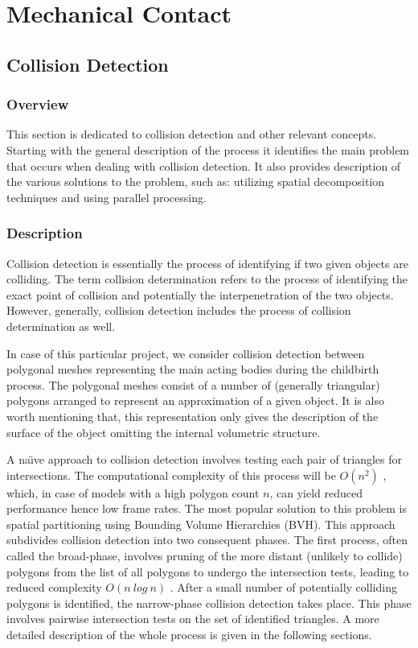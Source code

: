 \chapter{Mechanical Contact}\label{methodology-contact}

\section{Collision Detection}
  \subsection{Overview}
  This section is dedicated to collision detection and other relevant concepts. Starting with the general description of the process it identifies the main problem that occurs when dealing with collision detection. It also provides description of the various solutions to the problem, such as: utilizing spatial decomposition techniques and using parallel processing.
  \subsection{Description}
    Collision detection is essentially the process of identifying if two given objects are colliding. The term collision determination refers to the process of identifying the exact point of collision and potentially the interpenetration of the two objects. However, generally, collision detection includes the process of collision determination as well.

    In case of this particular project, we consider collision detection between polygonal meshes representing the main acting bodies during the childbirth process. The polygonal meshes consist of a number of (generally triangular) polygons arranged to represent an approximation of a given object. It is also worth mentioning that, this representation only gives the description of the surface of the object omitting the internal volumetric structure.


A na\"{\i}ve approach to collision detection involves testing each pair of triangles for intersections. The computational complexity of this process will be $O(n^2)$ \citep{gpuGems32}, which, in case of models with a high polygon count $n$, can yield reduced performance hence low frame rates. The most popular solution to this problem is spatial partitioning using Bounding Volume Hierarchies (BVH). This approach subdivides collision detection into two consequent phases. The first process, often called the broad-phase, involves pruning of the more distant (unlikely to collide) polygons from the list of all polygons to undergo the intersection tests, leading to reduced complexity $O(n~log~n)$ \citep{MPI}. After a small number of potentially colliding polygons is identified, the narrow-phase collision detection takes place. This phase involves pairwise intersection tests on the set of identified triangles. A more detailed description of the whole process is given in the following sections.

